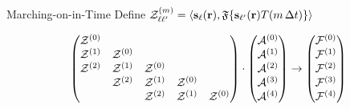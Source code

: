 \documentclass[aspectratio=169, usenames, dvipsnames]{beamer}
\begin{document}
\begin{frame}{Marching-on-in-Time}
  Define $\mathcal{Z}^\qty(m)_{\ell \ell'} = \langle \vb{s}_\ell(\vb{r}), \mathfrak{F}\qty{\vb{s}_{\ell '}(\vb{r}) T(m \, \Delta t)} \rangle$

  \begin{equation*}
    \mqty(
      \mathcal{Z}^{(0)} \\
      \mathcal{Z}^{(1)} & \mathcal{Z}^{(0)} \\
      \mathcal{Z}^{(2)} & \mathcal{Z}^{(1)} & \mathcal{Z}^{(0)} \\
      & \mathcal{Z}^{(2)} & \mathcal{Z}^{(1)} & \mathcal{Z}^{(0)} \\
      & & \mathcal{Z}^{(2)} & \mathcal{Z}^{(1)} & \mathcal{Z}^{(0)}
  ) \cdot
  \mqty(\mathcal{A}^{(0)} \\ \mathcal{A}^{(1)} \\ \mathcal{A}^{(2)} \\ \mathcal{A}^{(3)} \\ \mathcal{A}^{(4)}) \rightarrow
    \mqty(\mathcal{F}^{(0)} \\ \mathcal{F}^{(1)} \\ \mathcal{F}^{(2)} \\ \mathcal{F}^{(3)} \\ \mathcal{F}^{(4)})
  \end{equation*}

\end{frame}



\end{document}

